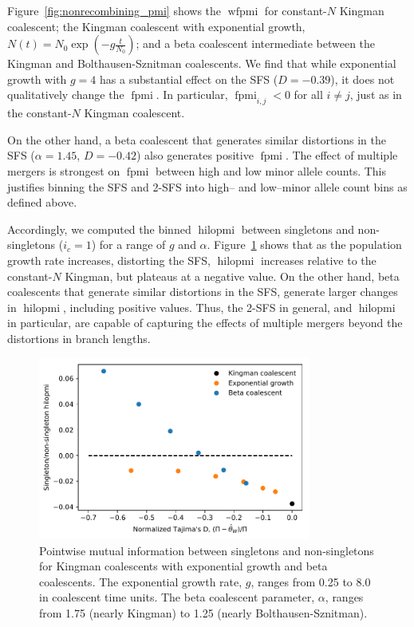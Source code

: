 \documentclass[11pt, letterpaper]{article}   	%
\newcommand{\Fig}[1]{Figure~\ref{#1}}
\DeclareMathOperator{\fpmi}{fpmi}
\DeclareMathOperator{\wfpmi}{wfpmi}
\DeclareMathOperator{\hilopmi}{hilopmi}
\begin{document}
\Fig{fig:nonrecombining_pmi} shows the $\wfpmi$ for constant-$N$ Kingman coalescent; the Kingman coalescent with exponential growth, $N(t)=N_0 \exp(-g \frac{t}{N_0})$; and a beta coalescent intermediate between the Kingman and Bolthausen-Sznitman coalescents.
We find that while exponential growth with $g=4$ has a substantial effect on the SFS ($D = -0.39$), it does not qualitatively change the $\fpmi$.
In particular, $\fpmi_{i,j} < 0$ for all $i \neq j$, just as in the constant-$N$ Kingman coalescent.

On the other hand, a beta coalescent that generates similar distortions in the SFS ($\alpha=1.45$, $D = -0.42$) also generates positive $\fpmi$.
The effect of multiple mergers is strongest on $\fpmi$ between high and low minor allele counts.
This justifies binning the SFS and 2-SFS into high-- and low--minor allele count bins as defined above.

Accordingly, we computed the binned $\hilopmi$ between singletons and non-singletons ($i_c = 1$) for a range of $g$ and $\alpha$.
\Fig{fig:fpmi_vs_tajimasd} shows that as the population growth rate increases, distorting the SFS, $\hilopmi$ increases relative to the constant-$N$ Kingman, but plateaus at a negative value.
On the other hand, beta coalescents that generate similar distortions in the SFS, generate larger changes in $\hilopmi$, including positive values.
Thus, the 2-SFS in general, and $\hilopmi$ in particular, are capable of capturing the effects of multiple mergers beyond the distortions in branch lengths.

\begin{figure}
\centering
\includegraphics[width=0.8\textwidth]{figures/hilopmi_vs_tajimasD.pdf}
\caption{Pointwise mutual information between singletons and non-singletons for Kingman coalescents with exponential growth and beta coalescents. The exponential growth rate, $g$, ranges from 0.25 to 8.0 in coalescent time units. The beta coalescent parameter, $\alpha$, ranges from 1.75 (nearly Kingman) to 1.25 (nearly Bolthausen-Sznitman). \label{fig:fpmi_vs_tajimasd}}
\end{figure}
\end{document}
